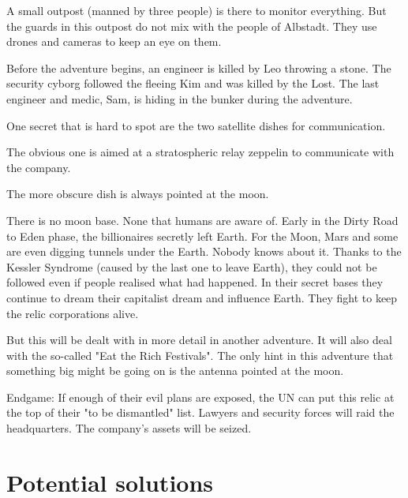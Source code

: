 A small outpost (manned by three people) is there to monitor everything. But the guards in this outpost do not mix with the people of Albstadt. They use drones and cameras to keep an eye on them.

Before the adventure begins, an engineer is killed by Leo throwing a stone. The security cyborg followed the fleeing Kim and was killed by the Lost.
The last engineer and medic, Sam, is hiding in the bunker during the adventure.

One secret that is hard to spot are the two satellite dishes for communication.

The obvious one is aimed at a stratospheric relay zeppelin to communicate with the company.

The more obscure dish is always pointed at the moon.

\begin{sidebarBox}[title=Kessler Syndrome]

    \hyperref[sec: Kessler Syndrome]{The Kessler Syndrome has killed all GPS satellites, Earth mapping and communications satellites. Earth orbit is inaccessible. The only fallback left is high-flying drones for mapping and communications relays.
\end{sidebarBox}


\begin{sidebarBox}[title=Moon base]

    There is no moon base. None that humans are aware of. Early in the Dirty Road to Eden phase, the billionaires secretly left Earth. For the Moon, Mars and some are even digging tunnels under the Earth. Nobody knows about it. Thanks to the Kessler Syndrome (caused by the last one to leave Earth), they could not be followed even if people realised what had happened.
    In their secret bases they continue to dream their capitalist dream and influence Earth. They fight to keep the relic corporations alive.

    But this will be dealt with in more detail in another adventure. It will also deal with the so-called "Eat the Rich Festivals". The only hint in this adventure that something big might be going on is the antenna pointed at the moon.
\end{sidebarBox}

Endgame: If enough of their evil plans are exposed, the UN can put this relic at the top of their "to be dismantled" list. Lawyers and security forces will raid the headquarters. The company's assets will be seized.

\section{Potential solutions}


